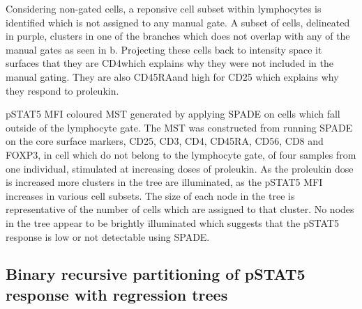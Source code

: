 { Considering non-gated cells, a reponsive cell subset within lymphocytes is identified which is not assigned to any manual gate.  }
{
A subset of cells, delineated in purple, clusters in one of the branches which does not overlap with any of the manual gates as seen in b.
Projecting these cells back to intensity space it surfaces that they are CD4\negative which explains why they were not included in the manual gating.
They are also CD45RA\negative and high for CD25 which explains why they respond to proleukin.
}

{pSTAT5 MFI coloured \gls{MST} generated by applying \gls{SPADE} on cells which fall outside of the lymphocyte gate.}
{
  The \gls{MST} was constructed from running \gls{SPADE} on the core surface markers,
  CD25, CD3, CD4, CD45RA, CD56, CD8 and FOXP3, in cell which do not belong to the lymphocyte gate, of four samples from one individual,
  stimulated at increasing doses of proleukin.
  As the proleukin dose is increased more clusters in the tree are illuminated, as the pSTAT5 MFI increases in various cell subsets.
  The size of each node in the tree is representative of the number of cells which are assigned to that cluster. 
  No nodes in the tree appear to be brightly illuminated which suggests that the pSTAT5 response is low or not detectable using SPADE.
}



\subsection{Binary recursive partitioning of pSTAT5 response with regression trees} 

